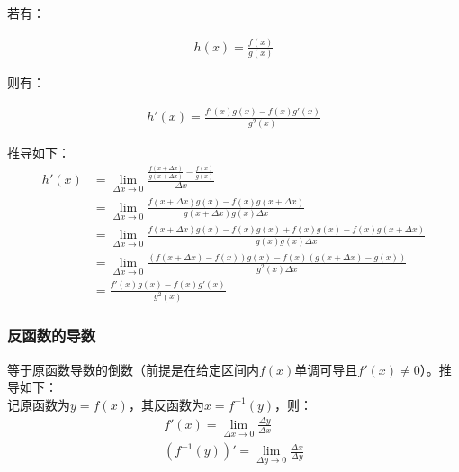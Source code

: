 \documentclass[12pt]{article}
\begin{document}
若有：

\begin{equation*}
\begin{aligned}
h(x) = \frac{f(x)}{g(x)}
\end{aligned}
\end{equation*}

则有：

\begin{equation*}
\begin{aligned}
h'(x) = \frac{f'(x)g(x) - f(x)g'(x)}{g^2(x)}
\end{aligned}
\end{equation*}

推导如下：\\

\begin{equation*}
\begin{aligned}
h'(x) & = \lim_{\Delta x \to 0}\frac{\frac{f(x + \Delta x)}{g(x + \Delta x)} - \frac{f(x)}{g(x)}}{\Delta x}\\
& = \lim_{\Delta x \to 0}\frac{f(x + \Delta x)g(x) - f(x)g(x + \Delta x)}{g(x + \Delta x)g(x)\Delta x}\\
& = \lim_{\Delta x \to 0}\frac{f(x + \Delta x)g(x) - f(x)g(x) + f(x)g(x) - f(x)g(x + \Delta x)}{g(x)g(x)\Delta x}\\
& = \lim_{\Delta x \to 0}\frac{(f(x + \Delta x)- f(x))g(x) - f(x)(g(x + \Delta x) - g(x))}{g^2(x)\Delta x}\\
& = \frac{f'(x)g(x) - f(x)g'(x)}{g^2(x)}
\end{aligned}
\end{equation*}

\subsubsection{反函数的导数}

等于原函数导数的倒数（前提是在给定区间内$f(x)$单调可导且$f'(x) \neq 0$）。推导如下：\\

记原函数为$y = f(x)$，其反函数为$x = f^{-1}(y)$，则：\\

\begin{equation*}
\begin{aligned}
f'(x) = \lim_{\Delta x \to 0}\frac{\Delta y}{\Delta x}\\
(f^{-1}(y))' = \lim_{\Delta y \to 0}\frac{\Delta x}{\Delta y}
\end{aligned}
\end{equation*}
\end{document}
